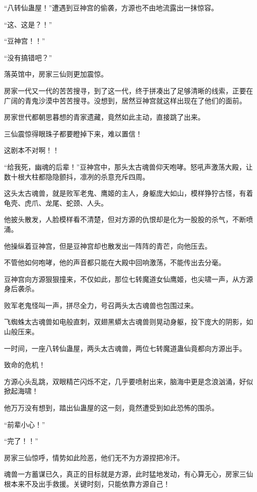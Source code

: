 
\begin{this_body}

“八转仙蛊屋！”遭遇到豆神宫的偷袭，方源也不由地流露出一抹惊容。

“这、这是？！”

“豆神宫！！”

“没有搞错吧？”

落英馆中，房家三仙则更加震惊。

房家一代又一代的苦苦搜寻，到了这一代，终于拼凑出了足够清晰的线索，正要在广阔的青鬼沙漠中苦苦搜寻。没想到，居然豆神宫就这样出现在了他们的面前。

房家世代都朝思暮想的青家遗藏，竟然如此主动，直接跳了出来。

三仙震惊得眼珠子都要瞪掉下来，难以置信！

这剧本不对啊！！

“给我死，幽魂的后辈！”豆神宫中，那头太古魂兽仰天咆哮。怒吼声激荡大殿，让数十根大柱都隐隐颤抖，凛冽的杀意充斥四周。

这头太古魂兽，就是败军老鬼、鹰姬的主人，身躯庞大如山，模样狰狞古怪，有着龟壳、虎爪、龙尾、蛇颈、人头。

他披头散发，人脸模样看不清楚，但对方源的仇恨却是化为一股股的杀气，不断喷涌。

他操纵着豆神宫，但是豆神宫却也散发出一阵阵的青芒，向他压去。

不管他如何咆哮，他的声音都只能在大殿中回响激荡，不能传出去分毫。

豆神宫向方源狠狠撞来，不仅如此，那位七转魔道女仙鹰姬，也尖啸一声，从方源身后袭杀。

败军老鬼怪叫一声，拼尽全力，号召两头太古魂兽也包围过来。

飞蜘蛛太古魂兽如电般直刺，双翅黑蟒太古魂兽则晃动身躯，投下庞大的阴影，如山般压来。

一时间，一座八转仙蛊屋，两头太古魂兽，两位七转魔道蛊仙竟都向方源出手。

致命的危机！

方源心头乱跳，双眼精芒闪烁不定，几乎要喷射出来，脑海中更是念浪汹涌，好似掀起海啸！

他万万没有想到，踏出仙蛊屋的这一刻，竟然遭受到如此恐怖的围杀。

“前辈小心！”

“完了！！”

房家三仙惊呼，情势如此险恶，他们无不为方源捏把冷汗。

魂兽一方蓄谋已久，真正的目标就是方源，此时猛地发动，有心算无心，房家三仙根本来不及出手救援。关键时刻，只能依靠方源自己！


\end{this_body}
